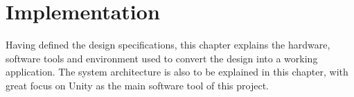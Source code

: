 \documentclass{l4proj}
\begin{document}
\chapter{Implementation}
\label{sec:implementation}

Having defined the design specifications, this chapter explains the hardware, software tools and environment used to convert the design into a working application. The system architecture is also to be explained in this chapter, with great focus on Unity as the main software tool of this project.
\end{document}
